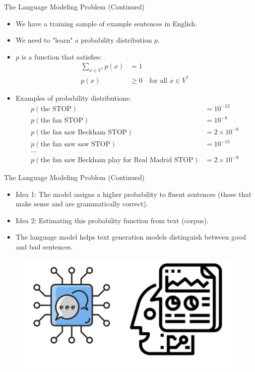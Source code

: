 \documentclass[handout]{beamer}
\begin{document}
\begin{frame}{The Language Modeling Problem (Continued)}
\begin{scriptsize}
\begin{itemize}
\item We have a training sample of example sentences in English.
\item We need to "learn" a probability distribution $p$.
\item $p$ is a function that satisfies:
\begin{align*}
\sum_{x\in V^*} p(x) &= 1 \\
p(x) &\geq 0 \quad \text{for all } x \in V^*
\end{align*}


\item Examples of probability distributions:
\begin{align*}
p(\text{the STOP}) &= 10^{-12} \\
p(\text{the fan STOP}) &= 10^{-8} \\
p(\text{the fan saw Beckham STOP}) &= 2 \times 10^{-8} \\
p(\text{the fan saw saw STOP}) &= 10^{-15} \\
\ldots \\
p(\text{the fan saw Beckham play for Real Madrid STOP}) &= 2 \times 10^{-9}
\end{align*}
\end{itemize}
\end{scriptsize}
\end{frame}



\begin{frame}{The Language Modeling Problem (Continued)}
\begin{scriptsize}
\begin{itemize}
\item Idea 1: The model assigns a higher probability to fluent sentences (those that make sense and are grammatically correct).
\item Idea 2: Estimating this probability function from text (corpus).
\item The language model helps text generation models distinguish between good and bad sentences.
\end{itemize}
\end{scriptsize}

\begin{figure}[h]
\includegraphics[scale = 0.4]{pics/lmdiagram.png}
\end{figure}
\end{frame}
\end{document}
